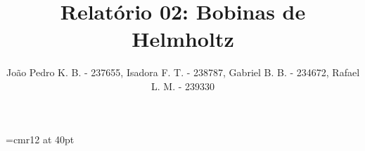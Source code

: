 \documentclass[reprint, amsmath,amssymb,onecolumn,notitlepage, 11pt, a4paper]{article}
\begin{document}
\font\myfont=cmr12 at 40pt


\title{Relatório 02: Bobinas de Helmholtz} %
\author{João Pedro K. B. - 237655, Isadora F. T. - 238787, Gabriel B. B. - 234672, Rafael L. M. - 239330} %

\date{} %
\maketitle %


\clearpage


\clearpage


\end{document}
